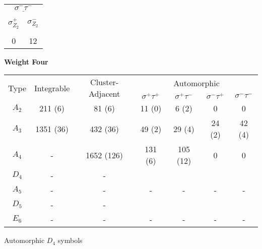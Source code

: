 \documentclass[12pt]{article}
\begin{document}
\begin{center}
\hspace{1.2cm}
\begin{tabular}{| c | c |}
\multicolumn{2}{c}{$\underline{\sigma^- \tau^-}$} \\[-1em]
\multicolumn{1}{c}{} & \multicolumn{1}{c}{} \\
\multicolumn{1}{c}{$\sigma_{Z_2}^+$} & \multicolumn{1}{c}{$\sigma_{Z_2}^-$} \\[-1em]
\multicolumn{1}{c}{} & \multicolumn{1}{c}{} \\
\hline
0 & 12 \\
\hline
\end{tabular} 
\vspace{.6cm}


\newpage

{\bf Weight Four}

\begin{tabular}{ | c | c | c | c | c | c |  c |}
\multicolumn{1}{c}{\multirow{2}{*}{Type}} & \multicolumn{1}{c}{\multirow{2}{*}{Integrable}} & \multicolumn{1}{c}{\multirow{2}{*}{Cluster-Adjacent}} & \multicolumn{4}{c}{Automorphic} \\
\multicolumn{1}{c}{} & \multicolumn{1}{c}{} & \multicolumn{1}{c}{} & \multicolumn{1}{c}{$\sigma^+ \tau^+$} & \multicolumn{1}{c}{$\sigma^+ \tau^-$} & \multicolumn{1}{c}{$\sigma^- \tau^+$} & \multicolumn{1}{c}{$\sigma^- \tau^-$} \\
\hline \(A_2\) & 211 (6) & 81 (6) & 11 (0) & 6 (2) & 0 & 0 \\ 
\hline \(A_3\) & 1351 (36) & 432 (36) & 49 (2) & 29 (4) & 24 (2) & 42 (4) \\ 
\hline \(A_4\) & - & 1652 (126) & 131 (6) & 105 (12) & 0 & 0 \\ 
\hline \(D_4\) & - & -  \\ 
\hline \(A_5\) & - & - & - & - & - & - \\ 
\hline \(D_5\) & - & -  \\ 
\hline \(E_6\) & - & - & - & - & - & -  \\ 
\hline
\end{tabular} 
\vspace{.6cm}

Automorphic $D_4$ symbols


\end{center}
\end{document}
